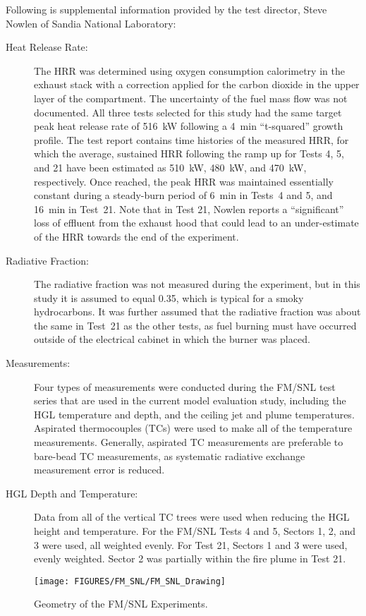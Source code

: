 Following is supplemental information provided by the test director, Steve Nowlen of Sandia National Laboratory:
\begin{description}
\item[Heat Release Rate:] The HRR was determined using oxygen consumption calorimetry in the exhaust stack with
a correction applied for the carbon dioxide in the upper layer of the compartment. The
uncertainty of the fuel mass flow was not documented. All three tests selected for this study had
the same target peak heat release rate of 516~kW following a 4~min ``t-squared'' growth
profile. The test report contains time histories of the measured HRR, for which the average,
sustained HRR following the ramp up for Tests 4, 5, and 21 have been estimated as 510~kW, 480~kW, and 470~kW, respectively.
Once reached, the peak HRR was maintained essentially constant
during a steady-burn period of 6~min in Tests~4 and 5, and 16~min in Test~21. Note that in Test 21, Nowlen reports a
``significant'' loss of effluent from the exhaust hood that could lead to an under-estimate of the HRR towards the end of the experiment.
\item[Radiative Fraction:] The radiative fraction was not measured during the experiment, but
in this study it is assumed to equal 0.35, which is typical for a smoky hydrocarbons.
It was further assumed that the radiative fraction was about the same in
Test~21 as the other tests, as fuel burning must have occurred outside of the electrical cabinet in
which the burner was placed.
\item[Measurements:] Four types of measurements were conducted during the FM/SNL test series that are used in the
current model evaluation study, including the HGL temperature and depth, and the ceiling jet and
plume temperatures. Aspirated thermocouples (TCs) were used to make all of the temperature
measurements. Generally, aspirated TC measurements are preferable to bare-bead TC measurements,
as systematic radiative exchange measurement error is reduced.
\item[HGL Depth and Temperature:] Data from all of the vertical TC trees were used when reducing
the HGL height and temperature. For the FM/SNL Tests 4 and 5, Sectors 1, 2, and 3 were used,
all weighted evenly. For Test 21, Sectors 1 and 3 were used, evenly weighted. Sector 2 was
partially within the fire plume in Test 21.
\end{description}

\begin{sidewaysfigure}[p]
\begin{center}
\texttt{[image: FIGURES/FM\_SNL/FM\_SNL\_Drawing]}
\end{center}
\caption{Geometry of the FM/SNL Experiments.}
\label{FM_SNL_Drawing}
\end{sidewaysfigure}

